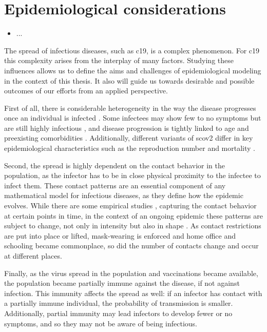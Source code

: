 \glsresetall
\chapter{Epidemiological considerations}
\label{chap:epidemiological_considerations}
\begin{tcolorbox}[title={Contributions of this chapter}]
    \begin{itemize}
        \item ...
    \end{itemize}
\end{tcolorbox}
\newpage

The spread of infectious diseases, such as \acrshort{c19}, is a complex phenomenon. For \acrshort{c19} this complexity arises from the interplay of many factors. Studying these influences allows us to define the aims and challenges of epidemiological modeling in the context of this thesis. It also will guide us towards desirable and possible outcomes of our efforts from an applied perspective.

First of all, there is considerable heterogeneity in the way the disease progresses once an individual is infected \cite{Salzberger2021Epidemiology} . Some infectees may show few to no symptoms but are still highly infectious \cite{Byambasuren2020Estimating}, and disease progression is tightly linked to age and preexisting comorbidities \cite{Biswas2020Association}. Additionally, different variants of \acrshort{scov2} differ in key epidemiological characteristics such as the reproduction number \cite{Du2022Reproduction} and mortality \cite{Hughes2023Effect}. 

Second, the spread is highly dependent on the contact behavior in the population, as the infector has to be in close physical proximity to the infectee to infect them. These contact patterns are an essential component of any mathematical model for infectious diseases, as they define how the epidemic evolves. While there are some empirical studies \cite{Tomori2021Individual,Mossong2008Social}, capturing the contact behavior at certain points in time, in the context of an ongoing epidemic these patterns are subject to change, not only in intensity but also in shape \cite{Tomori2021Individual}. As contact restrictions are put into place or lifted, mask-wearing is enforced and home office and schooling became commonplace, so did the number of contacts change and occur at different places.

Finally, as the virus spread in the population and vaccinations became available, the population became partially immune against the disease, if not against infection. This immunity affects the spread as well: if an infector has contact with a partially immune individual, the probability of transmission is smaller. Additionally, partial immunity may lead infectors to develop fewer or no symptoms, and so they may not be aware of being infectious. 

